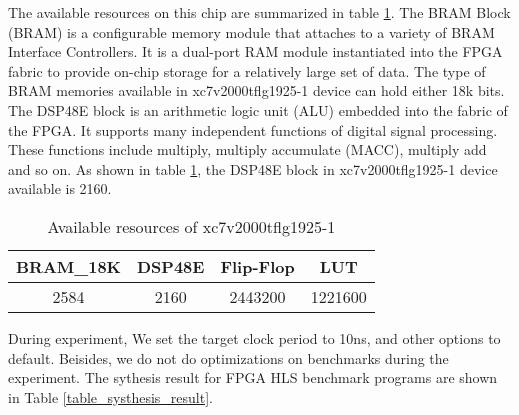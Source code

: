 \documentclass[conference]{IEEEtran}
\begin{document}
The available resources on this chip are summarized in table \ref{table_available_resources}. The BRAM Block (BRAM) is a configurable memory module that attaches to a variety of BRAM Interface Controllers. It is a dual-port RAM module instantiated into the FPGA fabric to provide on-chip storage for a relatively large set of data. The type of BRAM memories available in xc7v2000tflg1925-1 device can hold either 18k bits. The DSP48E block is an arithmetic logic unit (ALU) embedded into the fabric of the FPGA. It supports many independent functions of digital signal processing. These functions include multiply, multiply accumulate (MACC), multiply add and so on. As shown in table \ref{table_available_resources},  the DSP48E block in xc7v2000tflg1925-1 device available  is 2160.

%
\begin{table}
\caption{Available resources of xc7v2000tflg1925-1}\label{table_available_resources}
\begin{tabular}{|c|c|c|c|}
\hline
BRAM\_18K & DSP48E & Flip-Flop & LUT\tabularnewline
\hline
\hline
2584 & 2160 & 2443200 & 1221600\tabularnewline
\hline
\end{tabular}
\end{table}


During experiment, We set the target clock period to 10ns, and other options to default. Beisides, we do not do optimizations on benchmarks during the experiment. The sythesis result for FPGA HLS benchmark programs are shown in Table \ref{table_systhesis_result}.
\end{document}
